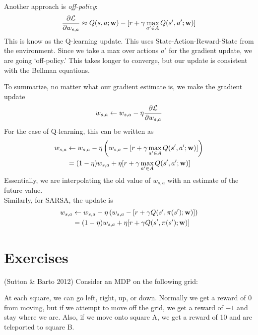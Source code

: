 \documentclass[12pt]{article}
\begin{document}
Another approach is \emph{off-policy}:
\begin{equation}
\frac{\partial \mathcal{L}}{\partial w_{s,a}} \approx Q(s,a;\mathbf{w}) - [r + \gamma \max_{a' \in A} Q(s', a'; \mathbf{w})]
\end{equation}
This is know as the Q-learning update. This uses State-Action-Reward-State from
the environment. Since we take a max over actions $a'$ for the gradient update, we are going `off-policy.' This takes longer to converge, but our update is consistent with the Bellman equations.

To summarize, no matter what our gradient estimate is, we make the gradient update
\begin{equation}
w_{s,a} \gets w_{s,a} - \eta \frac{\partial\mathcal{L}}{\partial w_{s,a}}
\end{equation}
For the case of Q-learning, this can be written as
\begin{align}
w_{s,a} &\gets w_{s,a} - \eta \left( w_{s,a} - [r + \gamma \max_{a' \in A} Q(s', a'; \mathbf{w})] \right) \\
&= (1-\eta) w_{s,a} + \eta  [r + \gamma \max_{a' \in A} Q(s', a'; \mathbf{w})]
\end{align}
Essentially, we are interpolating the old value of $w_{s,a}$ with an estimate of the future value.\\

\noindent Similarly, for SARSA, the update is
\begin{align}
w_{s,a} &\gets w_{s,a} - \eta \left( w_{s,a} - [r + \gamma  Q(s', \pi(s'); \mathbf{w})] \right) \\
&= (1-\eta) w_{s,a} + \eta  [r + \gamma  Q(s', \pi(s'); \mathbf{w})]
\end{align}

\section{Exercises}

(Sutton \& Barto 2012) Consider an MDP on the following grid:

\begin{center}
\end{center}

At each square, we can go left, right, up, or down. Normally we get a reward of 0 from moving, but if we attempt to move off the grid, we get a reward of $-1$ and stay where we are. Also, if we move onto square A, we get a reward of 10 and are teleported to square B.
\end{document}
